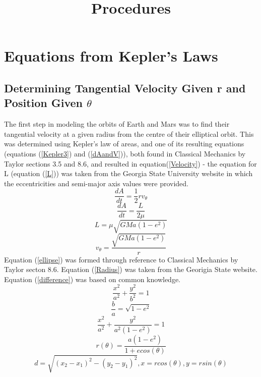 \documentclass{article}
\title{Procedures}
\begin{document}
\section{Equations from Kepler's Laws}
\subsection{Determining Tangential Velocity Given r and Position Given $\theta$}
\label{VelocitySection}
The first step in modeling the orbits of Earth and Mars was to find their tangential velocity at a given radius from
the centre of their elliptical orbit. This was determined using Kepler's law of areas, and one of its resulting 
equations (equations (\ref{Kepler3}) and (\ref{dAandV})), both found in Classical Mechanics by Taylor sections 3.5 and 
8.6, and resulted in equation(\ref{Velocity}) - the equation for L (equation (\ref{L})) was taken from the Georgia State University website in which the eccentricities and semi-major axis values were provided. 
\begin{equation}
	\frac{dA}{dt} = \frac{1}{2}rv_{\theta}
	\label{Kepler3}
\end{equation}
\begin{equation}
	\frac{dA}{dt} = \frac{L}{2\mu}
	\label{dAandV}
\end{equation}
\begin{equation}
	L =\mu\sqrt{GMa(1-e^2)}
	\label{L}
\end{equation}
\begin{equation}
	v_{\theta} = \frac{\sqrt{GMa(1-e^2)}}{r}
	\label{Velocity}
\end{equation}
Equation (\ref{ellipse}) was formed through reference to Classical Mechanics by Taylor secton 8.6. 
Equation (\ref{Radius}) was taken from the Georigia State website. Equation (\ref{difference}) was based on common
knowledge. 
\begin{equation}
	\frac{x^2}{a^2}+\frac{y^2}{b^2} = 1
\end{equation}
\begin{equation}
	\frac{b}{a} = \sqrt{1-e^2}
\end{equation}
\begin{equation}
	\frac{x^2}{a^2}+\frac{y^2}{a^2(1-e^2)} = 1
	\label{ellipse}
\end{equation}
\begin{equation}
	r(\theta) = \frac{a(1-e^2)}{1+ecos(\theta)}
	\label{Radius}
\end{equation}
\begin{equation}
	d = \sqrt{(x_{2} - x_{1})^2-(y_{2}-y_{1})^2}, x = rcos(\theta), y = rsin(\theta)
	\label{difference}
\end{equation}
\end{document}
